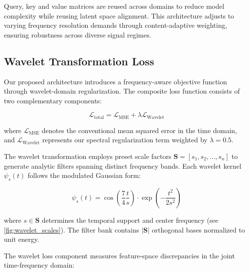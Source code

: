 \documentclass[12pt]{article}
\begin{document}


Query, key and value matrices are reused across domains to reduce model complexity while reusing latent space alignment. This architecture adjusts to varying frequency resolution demands through content-adaptive weighting, ensuring robustness across diverse signal regimes.


\subsection{Wavelet Transformation Loss}

Our proposed architecture introduces a frequency-aware objective function through wavelet-domain regularization. The composite loss function consists of two complementary components:

\begin{equation}
    \mathcal{L}_{\text{total}} = \mathcal{L}_{\text{MSE}} + \lambda\mathcal{L}_{\text{Wavelet}}
    \label{eq:combined_loss}
\end{equation}

where $\mathcal{L}_{\text{MSE}}$ denotes the conventional mean squared error in the time domain, and $\mathcal{L}_{\text{Wavelet}}$ represents our spectral regularization term weighted by $\lambda=0.5$.


The wavelet transformation employs preset scale factors $\mathbf{S} = [s_1, s_2, ..., s_n]$ to generate analytic filters spanning distinct frequency bands. Each wavelet kernel $\psi_s(t)$ follows the modulated Gaussian form:

\begin{equation}
    \psi_s(t) = \cos\left(\frac{7}{4}\frac{t}{s}\right) \cdot \exp\left(-\frac{t^2}{2s^2}\right)
    \label{eq:wavelet_def}
\end{equation}

where $s \in \mathbf{S}$ determines the temporal support and center frequency (see \autoref{fig:wavelet_scales}). The filter bank contains $|\mathbf{S}|$ orthogonal bases normalized to unit energy.


The wavelet loss component measures feature-space discrepancies in the joint time-frequency domain:
\end{document}
